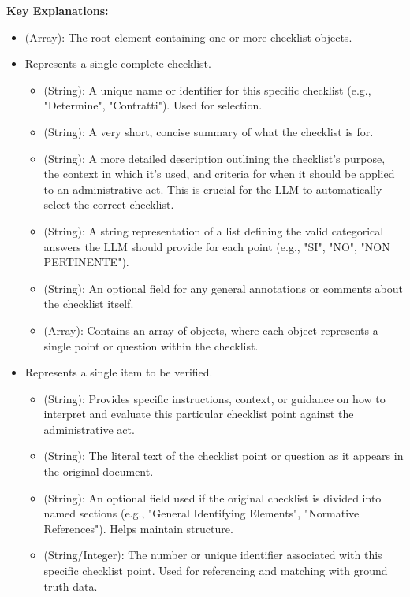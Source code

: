 \documentclass[../main.tex]{subfiles}
\begin{document}
\textbf{Key Explanations:}

\begin{itemize}
    \item {} (Array): The root element containing one or more checklist objects.
    \item {} Represents a single complete checklist.
    \begin{itemize}
        \item {} (String): A unique name or identifier for this specific checklist (e.g., "Determine", "Contratti"). Used for selection.
        \item {} (String): A very short, concise summary of what the checklist is for.
        \item {} (String): A more detailed description outlining the checklist's purpose, the context in which it's used, and criteria for when it should be applied to an administrative act. This is crucial for the LLM to automatically select the correct checklist.
        \item {} (String): A string representation of a list defining the valid categorical answers the LLM should provide for each point (e.g., "SI", "NO", "NON PERTINENTE").
        \item {} (String): An optional field for any general annotations or comments about the checklist itself.
        \item {} (Array): Contains an array of objects, where each object represents a single point or question within the checklist.
    \end{itemize}
    \item {} Represents a single item to be verified.
    \begin{itemize}
        \item {} (String): Provides specific instructions, context, or guidance on how to interpret and evaluate this particular checklist point against the administrative act.
        \item {} (String): The literal text of the checklist point or question as it appears in the original document.
        \item {} (String): An optional field used if the original checklist is divided into named sections (e.g., "General Identifying Elements", "Normative References"). Helps maintain structure.
        \item {} (String/Integer): The number or unique identifier associated with this specific checklist point. Used for referencing and matching with ground truth data.
    \end{itemize}
\end{itemize}


 


\end{document}
